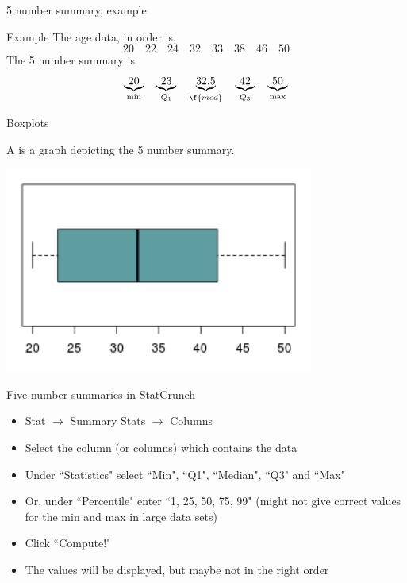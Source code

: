 \documentclass[xcolor=table]{beamer}
\begin{document}
\begin{frame}{5 number summary, example}
\begin{exampleblock}{Example}
The age data, in order is, 
\[20 \quad 22 \quad 24 \quad 32 \quad 33 \quad 38 \quad 46 \quad 50 \]
The 5 number summary is
\[\underbrace{20}_{\min} \quad \underbrace{23}_{Q_1} \quad \underbrace{32.5}_{\f{med}} \quad \underbrace{42}_{Q_3} \quad \underbrace{50}_{\max}\]
\end{exampleblock}
\end{frame}

\begin{frame}{Boxplots}
\begin{block}{}
\large
A  is a graph depicting the 5 number summary.
\end{block}
{\centering
\includegraphics[width=4in]{../images/ch03_boxplot}\par
}
\end{frame}

\begin{frame}{Five number summaries in StatCrunch}
\begin{block}{}
\begin{itemize}
\item Stat $\to$ Summary Stats $\to$ Columns
\item Select the column (or columns) which contains the data
\item Under ``Statistics" select ``Min", ``Q1", ``Median", ``Q3" and ``Max"
\item Or, under ``Percentile" enter ``1, 25, 50, 75, 99" (might not give correct values for the min and max in large data sets)
\item Click ``Compute!"
\item The values will be displayed, but maybe not in the right order
\end{itemize}
\end{block}

\end{frame}
\end{document}
